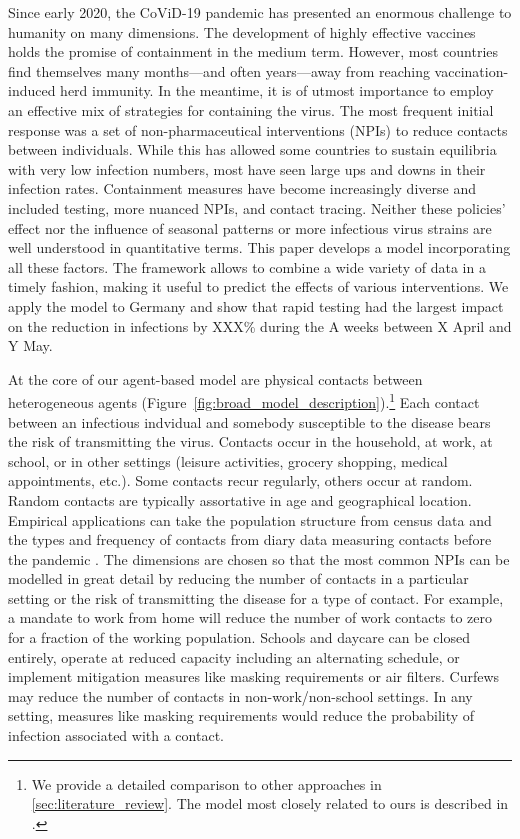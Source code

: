 Since early 2020, the CoViD-19 pandemic has presented an enormous challenge to humanity on many dimensions. The development of highly effective vaccines holds the promise of containment in the medium term. However, most countries find themselves many months---and often years---away from reaching vaccination-induced herd immunity. In the meantime, it is of utmost importance to employ an effective mix of strategies for containing the virus. The most frequent initial response was a set of non-pharmaceutical interventions (NPIs) to reduce contacts between individuals. While this has allowed some countries to sustain equilibria with very low infection numbers, most have seen large ups and downs in their infection rates. Containment measures have become increasingly diverse and included testing, more nuanced NPIs, and contact tracing. Neither these policies' effect nor the influence of seasonal patterns or more infectious virus strains are well understood in quantitative terms. This paper develops a model incorporating all these factors. The framework allows to combine a wide variety of data in a timely fashion, making it useful to predict the effects of various interventions. We apply the model to Germany and show that rapid testing had the largest impact on the reduction in infections by XXX\% during the A weeks between X April and Y May.

At the core of our agent-based model are physical contacts between heterogeneous agents (Figure~\ref{fig:broad_model_description}).\footnote{We provide a detailed comparison to other approaches in \ref{sec:literature_review}. The model most closely related to ours is described in \citet{Hinch2020}.} Each contact between an infectious indvidual and somebody susceptible to the disease bears the risk of transmitting the virus. Contacts occur in the household, at work, at school, or in other settings (leisure activities, grocery shopping, medical appointments, etc.). Some contacts recur regularly, others occur at random. Random contacts are typically assortative in age and geographical location. Empirical applications can take the population structure from census data and the types and frequency of contacts from diary data measuring contacts before the pandemic \citep[e.g.][]{Mossong2008}. The dimensions are chosen so that the most common NPIs can be modelled in great detail by reducing the number of contacts in a particular setting or the risk of transmitting the disease for a type of contact. For example, a mandate to work from home will reduce the number of work contacts to zero for a fraction of the working population. Schools and daycare can be closed entirely, operate at reduced capacity including an alternating schedule, or implement mitigation measures like masking requirements or air filters. Curfews may reduce the number of contacts in non-work/non-school settings. In any setting, measures like masking requirements would reduce the probability of infection associated with a contact.

